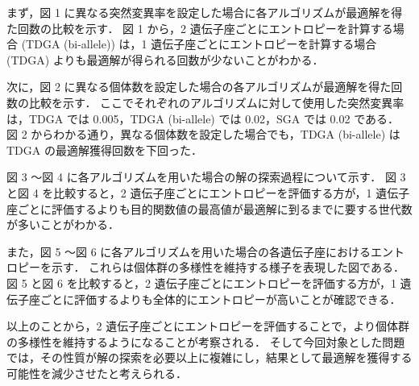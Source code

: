 \documentclass[dvipdfmx,autodetect-engine]{ujarticle}
\begin{document}
	まず，図 1 に異なる突然変異率を設定した場合に各アルゴリズムが最適解を得た回数の比較を示す．
	図 1 から，2 遺伝子座ごとにエントロピーを計算する場合 (TDGA (bi-allele)) は，1 遺伝子座ごとにエントロピーを計算する場合 (TDGA) よりも最適解が得られる回数が少ないことがわかる．
	\par

	次に，図 2 に異なる個体数を設定した場合の各アルゴリズムが最適解を得た回数の比較を示す．
	ここでそれぞれのアルゴリズムに対して使用した突然変異率は，TDGA では 0.005，TDGA (bi-allele) では 0.02，SGA では 0.02 である．
	図 2 からわかる通り，異なる個体数を設定した場合でも，TDGA (bi-allele) は TDGA の最適解獲得回数を下回った．
	\par

	図 3 〜図 4 に各アルゴリズムを用いた場合の解の探索過程について示す．
	図 3 と図 4 を比較すると，2 遺伝子座ごとにエントロピーを評価する方が，1 遺伝子座ごとに評価するよりも目的関数値の最高値が最適解に到るまでに要する世代数が多いことがわかる．\par

	また，図 5 〜図 6 に各アルゴリズムを用いた場合の各遺伝子座におけるエントロピーを示す．
	これらは個体群の多様性を維持する様子を表現した図である．
	図 5 と図 6 を比較すると，2 遺伝子座ごとにエントロピーを評価する方が，1 遺伝子座ごとに評価するよりも全体的にエントロピーが高いことが確認できる．\par

	以上のことから，2 遺伝子座ごとにエントロピーを評価することで，より個体群の多様性を維持するようになることが考察される．
	そして今回対象とした問題では，その性質が解の探索を必要以上に複雑にし，結果として最適解を獲得する可能性を減少させたと考えられる．
\end{document}
